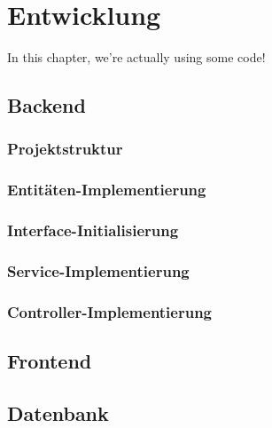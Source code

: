 \chapter{Entwicklung}\label{ch:method}

In this chapter, we're actually using some code!
\section{Backend}
\subsection{Projektstruktur}
\subsection{Entitäten-Implementierung}
\subsection{Interface-Initialisierung}
\subsection{Service-Implementierung}
\subsection{Controller-Implementierung}
\section{Frontend}
\section{Datenbank}
\
